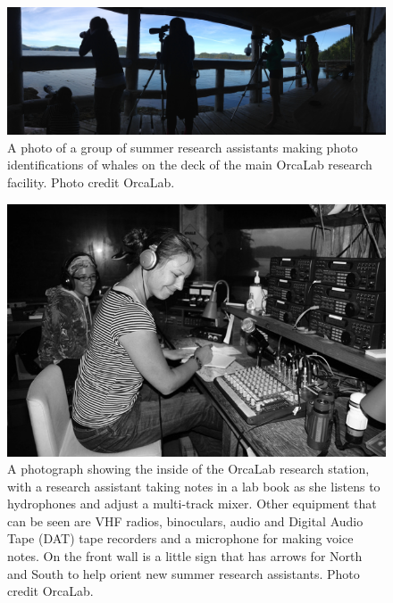 \begin{figure}[t]
\centering
\includegraphics[width=\columnwidth]{figures/orcaLabOnDeck}
\caption{A photo of a group of summer research assistants making photo
  identifications of whales on the deck of the main OrcaLab research
  facility.  Photo credit OrcaLab.}
\label{fig:orcaLabOnDeck}
\end{figure}

\begin{figure}[t]
\centering
\includegraphics[width=\columnwidth]{figures/orcaLabWork}
\caption{A photograph showing the inside of the OrcaLab research
  station, with a research assistant taking notes in a lab book
  as she listens to hydrophones and adjust a multi-track mixer.  Other
  equipment that can be seen are VHF radios, binoculars, audio and
  Digital Audio Tape (DAT) tape recorders and a microphone for making
  voice notes.  On the front wall is a little sign that has arrows for
  North and South to help orient new summer research assistants. Photo
  credit OrcaLab.}
\label{fig:orcaLabWork}
\end{figure}

